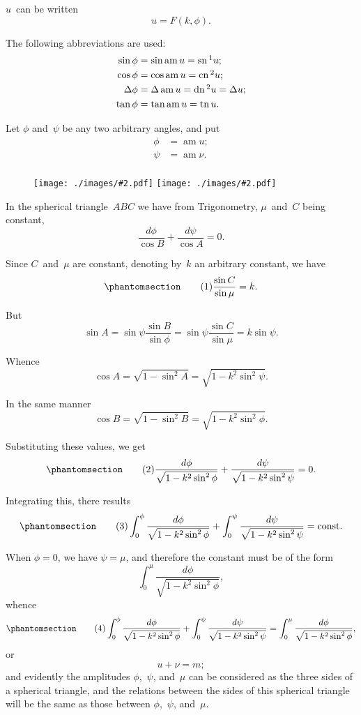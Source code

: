 \documentclass[12pt,leqno]{book}[2005/09/16]
\newcommand{\mychapno}{}%
\DeclareMathOperator{\am}{am}
\DeclareMathOperator{\cn}{cn}
\DeclareMathOperator{\dn}{dn}
\DeclareMathOperator{\sn}{sn}
\DeclareMathOperator{\tn}{tn}
\newcommand{\Input}[2][]
  {\ifthenelse{\equal{#1}{}}
  {\texttt{[image: ./images/\#2.pdf]}}
  {\texttt{[image: ./images/\#2.pdf]}}%
}
\newcommand{\DPtypo}[2]{#2}
\newcommand{\Tag}[2][]{%
  \phantomsection
  \ifthenelse{\equal{#1}{}}
             {\label{eqn:\mychapno.#2}}
             {\label{eqn:\mychapno.(#1)}}
  \tag*{\normalsize\ensuremath{#2}}
}
\begin{document}
$u$~can be written
\[
u = F(k, \phi).
\]

The following abbreviations are used:
\begin{align*}
\sin \phi &= \sin \am u = \sn\footnotemark u; \\
\cos \phi &= \cos \am u = \cn\footnotemark[2] u; \\
\Delta \phi &= \Delta \am u = \dn\footnotemark[2] u = \Delta u; \\
\tan \phi &= \tan \am u = \tn u.
\end{align*}
%

Let $\phi$ and~$\psi$ be any two arbitrary angles, and put
\begin{align*}
\phi &= \am u;\\
\psi &= \am \nu.\\
\end{align*}

\begin{wrapfigure}{r}{1.25in}
  \Input[1in]{023a}
\end{wrapfigure}
In the spherical triangle~$ABC$ we have from
Trigonometry, $\DPtypo{c}{\mu}$~and~$C$ being constant,
\[
\frac{d\phi}{\cos B} + \frac{d\psi}{\cos A} = 0.
\]

Since $C$~and~$\DPtypo{c}{\mu}$ are constant, denoting by~$k$ an arbitrary constant,
we have
\[
\Tag{(1)}
\frac{\sin C}{\sin \mu} = k.
\]

But
\[
\sin A
  = \sin\psi \frac{\sin B}{\sin \phi}
  = \sin\psi \frac{\sin C}{\sin \mu}
  = k \sin\psi.
\]

Whence
\[
\cos A
  = \sqrt{1 - \sin^{2}A}
  = \sqrt{1 - k^{2} \sin^{2} \psi}.
\]

In the same manner
\[
\cos B
  = \sqrt{1 - \sin^{2}B}
  = \sqrt{1 - k^{2} \sin^{2} \phi}.
\]

Substituting these values, we get
\[
\Tag{(2)}
\frac{d\phi}{\sqrt{1 - k^{2} \sin^{2} \phi}} +
\frac{d\psi}{\sqrt{1 - k^{2} \sin^{2} \psi}} = 0.
\]

Integrating this, there results
\[
\Tag{(3)}
\int_0^\phi \frac{d\phi}{\sqrt{1 - \DPtypo{k_2}{k^2} \sin^{2}\phi}} +
\int_0^\psi \frac{d\psi}{\sqrt{1 - k^2 \sin^2\psi}} = \text{const}.
\]

When $\phi = 0$, we have $\psi = \mu$, and therefore the constant
must be of the form
\[
\int_0^\mu \frac{d\phi}{\sqrt{1 - k^2 \sin^2 \phi}},
\]
whence
\[
\Tag{(4)}
\int_0^\phi \frac{d \phi}{\sqrt{1 - k^2 \sin^2 \phi}} +
\int_0^\psi \frac{d \psi}{\sqrt{1 - k^2 \sin^2 \psi}} =
\int_0^\mu  \frac{d \phi}{\sqrt{1 - k^2 \sin^2 \phi}},
\]
or
\[
u + \nu = m;
\]
and evidently the amplitudes $\phi$,~$\psi$, and~$\mu$ can be considered as
the three sides of a spherical triangle, and the relations between
the sides of this spherical triangle will be the same as those
between $\phi$,~$\psi$, and~$\mu$.
\end{document}
